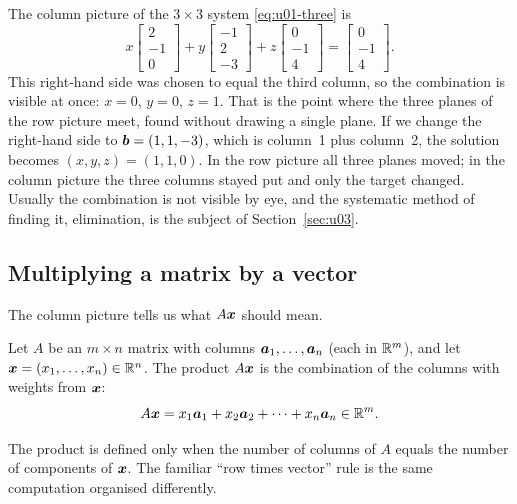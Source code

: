 The column picture of the $3\times3$ system \eqref{eq:u01-three} is
\[
  x\begin{bmatrix} 2\\ -1\\ 0\end{bmatrix}
  + y\begin{bmatrix} -1\\ 2\\ -3\end{bmatrix}
  + z\begin{bmatrix} 0\\ -1\\ 4\end{bmatrix}
  = \begin{bmatrix} 0\\ -1\\ 4\end{bmatrix}.
\]
This right-hand side was chosen to equal the third column, so the combination is visible at
once: $x=0$, $y=0$, $z=1$. That is the point where the three planes of the row picture meet,
found without drawing a single plane. If we change the right-hand side to
$\boldsymbol{b}=(1,1,-3)$, which is column~1 plus column~2, the solution becomes $(x,y,z)=(1,1,0)$.
In the row picture all three planes moved; in the column picture the three columns stayed
put and only the target changed. Usually the combination is not visible by eye, and the
systematic method of finding it, elimination, is the subject of Section~\ref{sec:u03}.

\subsection{Multiplying a matrix by a vector}\label{subsec:u01-product}

The column picture tells us what $A\boldsymbol{x}$ should mean.

\begin{definition}\label{def:u01-Ax}
Let $A$ be an $m\times n$ matrix with columns $\boldsymbol{a}_1,\dots,\boldsymbol{a}_n$ (each in $\mathbb{R}^m$),
and let $\boldsymbol{x}=(x_1,\dots,x_n)\in\mathbb{R}^n$. The product $A\boldsymbol{x}$ is the combination of the
columns with weights from $\boldsymbol{x}$:
\[
  A\boldsymbol{x} = x_1\boldsymbol{a}_1 + x_2\boldsymbol{a}_2 + \cdots + x_n\boldsymbol{a}_n \in \mathbb{R}^m .
\]
\end{definition}

The product is defined only when the number of columns of $A$ equals the number of
components of $\boldsymbol{x}$. The familiar ``row times vector'' rule is the same computation
organised differently.

